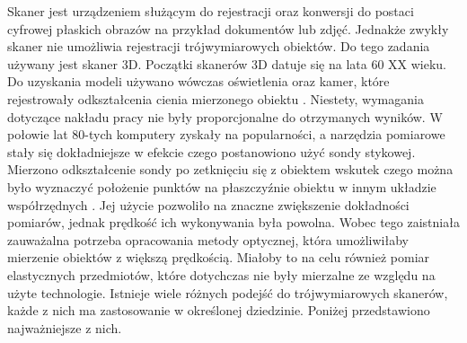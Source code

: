 Skaner jest urządzeniem służącym do rejestracji oraz konwersji do postaci cyfrowej płaskich obrazów na przykład dokumentów lub zdjęć. Jednakże zwykły skaner nie umożliwia rejestracji trójwymiarowych obiektów. Do tego zadania używany jest skaner 3D. Początki skanerów 3D datuje się na lata 60 XX wieku. Do uzyskania modeli używano wówczas oświetlenia oraz kamer, które rejestrowały odkształcenia cienia mierzonego obiektu \cite{ebrahim20153d}. Niestety, wymagania dotyczące nakładu pracy nie były proporcjonalne do otrzymanych wyników. W połowie lat 80-tych komputery zyskały na popularności, a narzędzia pomiarowe stały się dokładniejsze w efekcie czego postanowiono użyć sondy stykowej. Mierzono odkształcenie sondy po zetknięciu się z obiektem wskutek czego można było wyznaczyć położenie punktów na płaszczyźnie obiektu w innym układzie współrzędnych \cite{abdel20113d}. Jej użycie pozwoliło na znaczne zwiększenie dokładności pomiarów, jednak prędkość ich wykonywania była powolna. Wobec tego zaistniała zauważalna potrzeba opracowania metody optycznej, która umożliwiłaby mierzenie obiektów z większą prędkością. Miałoby to na celu również pomiar elastycznych przedmiotów, które dotychczas nie były mierzalne ze względu na użyte technologie. Istnieje wiele różnych podejść do trójwymiarowych skanerów, każde z nich ma zastosowanie w określonej dziedzinie. Poniżej przedstawiono najważniejsze z nich.